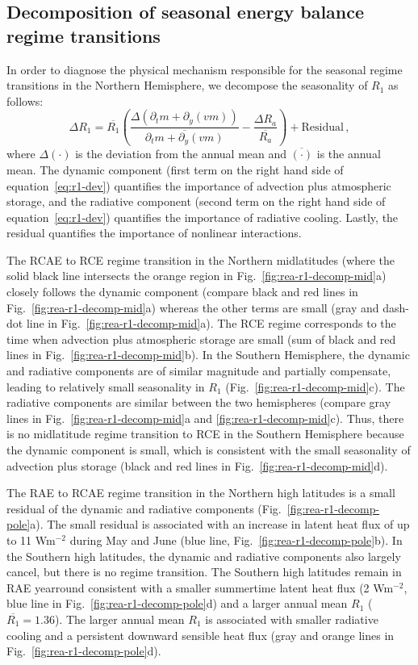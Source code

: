 \documentclass{ametsocV5}
\begin{document}
    \subsection{Decomposition of seasonal energy balance regime transitions}
    In order to diagnose the physical mechanism responsible for the seasonal regime transitions in the Northern Hemisphere, we decompose the seasonality of $R_1$ as follows:
    \begin{equation}\label{eq:r1-dev}
      \Delta R_1 = \overline{R_1}\left( \frac{\Delta(\partial_t m + \partial_y (vm))}{\overline{\partial_t m + \partial_y (vm)}}  - \frac{\Delta R_a }{\overline{R_a}}\right) + \mathrm{Residual} \, ,
    \end{equation}
    where $\Delta(\cdot)$ is the deviation from the annual mean and $\overline{(\cdot)}$ is the annual mean. The dynamic component (first term on the right hand side of equation~\ref{eq:r1-dev}) quantifies the importance of advection plus atmospheric storage, and the radiative component (second term on the right hand side of equation~\ref{eq:r1-dev}) quantifies the importance of radiative cooling. Lastly, the residual quantifies the importance of nonlinear interactions.

    The RCAE to RCE regime transition in the Northern midlatitudes (where the solid black line intersects the orange region in Fig.~\ref{fig:rea-r1-decomp-mid}a) closely follows the dynamic component (compare black and red lines in Fig.~\ref{fig:rea-r1-decomp-mid}a) whereas the other terms are small (gray and dash-dot line in Fig.~\ref{fig:rea-r1-decomp-mid}a). The RCE regime corresponds to the time when advection plus atmospheric storage are small (sum of black and red lines in Fig.~\ref{fig:rea-r1-decomp-mid}b). In the Southern Hemisphere, the dynamic and radiative components are of similar magnitude and partially compensate, leading to relatively small seasonality in $R_1$ (Fig.~\ref{fig:rea-r1-decomp-mid}c). The radiative components are similar between the two hemispheres (compare gray lines in Fig.~\ref{fig:rea-r1-decomp-mid}a and \ref{fig:rea-r1-decomp-mid}c). Thus, there is no midlatitude regime transition to RCE in the Southern Hemisphere because the dynamic component is small, which is consistent with the small seasonality of advection plus storage (black and red lines in Fig.~\ref{fig:rea-r1-decomp-mid}d).

    The RAE to RCAE regime transition in the Northern high latitudes is a small residual of the dynamic and radiative components (Fig.~\ref{fig:rea-r1-decomp-pole}a). The small residual is associated with an increase in latent heat flux of up to 11 Wm$^{-2}$ during May and June (blue line, Fig.~\ref{fig:rea-r1-decomp-pole}b). In the Southern high latitudes, the dynamic and radiative components also largely cancel, but there is no regime transition. The Southern high latitudes remain in RAE yearround consistent with a smaller summertime latent heat flux (2 Wm$^{-2}$, blue line in Fig.~\ref{fig:rea-r1-decomp-pole}d) and a larger annual mean $R_1$ ($\overline{R_1}=1.36$). The larger annual mean $R_1$ is associated with smaller radiative cooling and a persistent downward sensible heat flux (gray and orange lines in Fig.~\ref{fig:rea-r1-decomp-pole}d).
    
\end{document}
